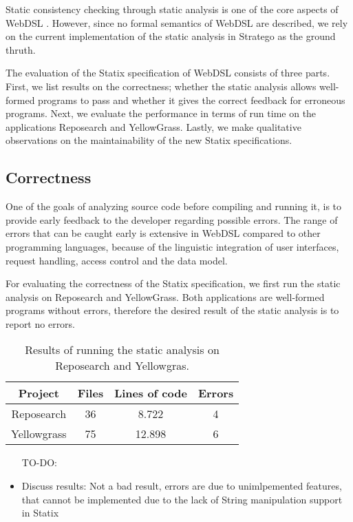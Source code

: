   Static consistency checking through static analysis is one of the core aspects of WebDSL \autocite{Hemel2011}. However, since no formal semantics of WebDSL are described, we rely on the current implementation of the static analysis in Stratego as the ground thruth.
  
  The evaluation of the Statix specification of WebDSL consists of three parts. First, we list results on the correctness; whether the static analysis allows well-formed programs to pass and whether it gives the correct feedback for erroneous programs. Next, we evaluate the performance in terms of run time on the applications Reposearch and YellowGrass. Lastly, we make qualitative observations on the maintainability of the new Statix specifications.

  \subsection{Correctness}

    One of the goals of analyzing source code before compiling and running it, is to provide early feedback to the developer regarding possible errors. The range of errors that can be caught early is extensive in WebDSL compared to other programming languages, because of the linguistic integration of user interfaces, request handling, access control and the data model.

    For evaluating the correctness of the Statix specification, we first run the static analysis on Reposearch and YellowGrass. Both applications are well-formed programs without errors, therefore the desired result of the static analysis is to report no errors.

    \begin{table}[h]
      \centering
      \begin{tabular}{ | c || c | c | c | }
        \hline
        Project & Files & Lines of code & Errors \\
        \hline
        Reposearch & 36 & 8.722 & 4 \\
        \hline
        Yellowgrass & 75 & 12.898 & 6 \\
        \hline
      \end{tabular}
      \caption{\label{tbl:statix-reposearch-yellowgrass-results}Results of running the static analysis on Reposearch and Yellowgras.}
    \end{table}

    \begin{itemize}
      \item[TO-DO:]
      \item Discuss results: Not a bad result, errors are due to unimlpemented features, that cannot be implemented due to the lack of String manipulation support in Statix
    \end{itemize}

